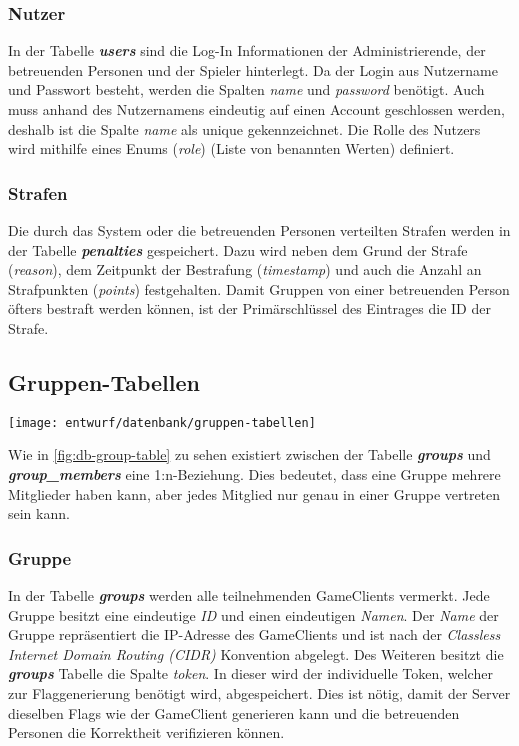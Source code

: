 \subsubsection{Nutzer}
In der Tabelle \textbf{\textit{users}} sind die Log-In Informationen der Administrierende, der betreuenden Personen und der Spieler hinterlegt. Da der Login aus Nutzername und Passwort besteht, werden die Spalten \textit{name} und \textit{password} benötigt. Auch muss anhand des Nutzernamens eindeutig auf einen Account geschlossen werden, deshalb ist die Spalte \textit{name} als unique gekennzeichnet. Die Rolle des Nutzers wird mithilfe eines Enums (\textit{role}) (Liste von benannten Werten) definiert.

\subsubsection{Strafen}
Die durch das System oder die betreuenden Personen verteilten Strafen werden in der Tabelle \textbf{\textit{penalties}} gespeichert. Dazu wird neben dem Grund der Strafe (\textit{reason}), dem Zeitpunkt der Bestrafung (\textit{timestamp}) und auch die Anzahl an Strafpunkten (\textit{points}) festgehalten. Damit Gruppen von einer betreuenden Person öfters bestraft werden können, ist der Primärschlüssel des Eintrages die ID der Strafe.

\subsection{Gruppen-Tabellen}
\begin{center}
	\texttt{[image: entwurf/datenbank/gruppen-tabellen]}
	\label{fig:db-group-table}
\end{center}

Wie in \autoref{fig:db-group-table} zu sehen existiert zwischen der Tabelle \textbf{\textit{groups}} und \textbf{\textit{group\_members}} eine 1:n-Beziehung. Dies bedeutet, dass eine Gruppe mehrere Mitglieder haben kann, aber jedes Mitglied nur genau in einer Gruppe vertreten sein kann.

\subsubsection{Gruppe}
In der Tabelle \textbf{\textit{groups}} werden alle teilnehmenden GameClients vermerkt. Jede Gruppe besitzt eine eindeutige \textit{ID} und einen eindeutigen \textit{Namen}. Der \textit{Name} der Gruppe repräsentiert die IP-Adresse des GameClients und ist nach der \textit{Classless Internet Domain Routing (CIDR)} Konvention abgelegt. Des Weiteren besitzt die \textbf{\textit{groups}} Tabelle die Spalte \textit{token}. In dieser wird der individuelle Token, welcher zur Flaggenerierung benötigt wird, abgespeichert. Dies ist nötig, damit der Server dieselben Flags wie der GameClient generieren kann und die betreuenden Personen die Korrektheit verifizieren können.

